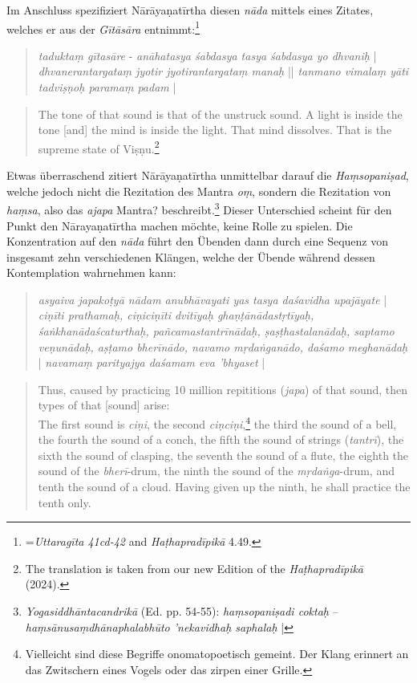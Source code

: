 Im Anschluss spezifiziert Nārāyaṇatīrtha diesen \textit{nāda} mittels eines Zitates, welches er aus der \textit{Gītāsāra} entnimmt:\footnote{=\textit{Uttaragīta 41cd-42} and \textit{Haṭhapradīpikā} 4.49.}

\begin{quote}
\textit{taduktaṃ gītasāre} -
\textit{anāhatasya śabdasya tasya śabdasya yo dhvaniḥ} |
\textit{dhvanerantargataṃ jyotir jyotirantargataṃ manaḥ} ||
\textit{tanmano vimalaṃ yāti tadviṣṇoḥ paramaṃ padam} |
\end{quote}
\begin{quote}
The tone of that sound is that of the unstruck sound. A light is inside the tone [and] the mind is inside the light. That mind dissolves. That is the supreme state of Viṣṇu.\footnote{The translation is taken from our new Edition of the \textit{Haṭhapradīpikā} (2024).}
  \end{quote}

  Etwas überraschend zitiert Nārāyaṇatīrtha unmittelbar darauf die \textit{Haṃsopaniṣad}, welche jedoch nicht die Rezitation des Mantra \textit{oṃ}, sondern die Rezitation von \textit{haṃsa}, also das \textit{ajapa} Mantra? beschreibt.\footnote{\textit{Yogasiddhāntacandrikā} (Ed. pp. 54-55): \textit{haṃsopaniṣadi coktaḥ} – \textit{haṃsānusaṃdhānaphalabhūto 'nekavidhaḥ saphalaḥ} |} Dieser Unterschied scheint für den Punkt den Nārayaṇatīrtha machen möchte, keine Rolle zu spielen. Die Konzentration auf den \textit{nāda} führt den Übenden dann durch eine Sequenz von insgesamt zehn verschiedenen Klängen, welche der Übende während dessen Kontemplation wahrnehmen kann:
\begin{quote}
  \textit{asyaiva japakoṭyā nādam anubhāvayati yas tasya daśavidha upajāyate} | 
  \textit{ciṇīti prathamaḥ, ciṇiciṇīti dvitīyaḥ ghaṇṭānādastṛtīyaḥ, śaṅkhanādaścaturthaḥ, pañcamastantrīnādaḥ, ṣaṣṭhastalanādaḥ, saptamo veṇunādaḥ, aṣṭamo bherīnādo, navamo mṛdaṅganādo, daśamo meghanādaḥ} | \textit{navamaṃ parityajya daśamam eva 'bhyaset} |
\end{quote}
\begin{quote}
  Thus, caused by practicing 10 million repititions (\textit{japa}) of that sound, then types of that [sound] arise: \\
  The first sound is \textit{ciṇi}, the second \textit{ciṇciṇi},\footnote{Vielleicht sind diese Begriffe onomatopoetisch gemeint. Der Klang erinnert an das Zwitschern eines Vogels oder das zirpen einer Grille.} the third the sound of a bell, the fourth the sound of a conch, the fifth the sound of strings (\textit{tantrī}), the sixth the sound of clasping, the seventh the sound of a flute, the eighth the sound of the \textit{bherī}-drum, the ninth the sound of the \textit{mṛdaṅga}-drum, and tenth the sound of a cloud. Having given up the ninth, he shall practice the tenth only. 
\end{quote}

